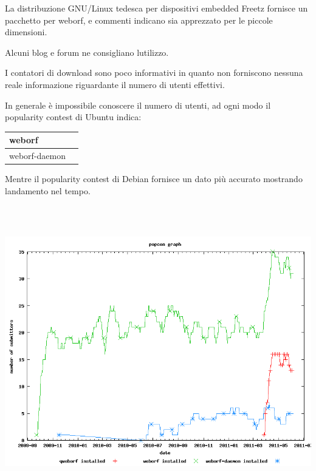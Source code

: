 \documentclass[a4paper,11pt]{article}
\makeatletter
\newcommand\captionof[1]{\def\@captype{#1}\caption}
\makeatother
\begin{document}
{\sffamily
La distribuzione GNU/Linux tedesca per dispositivi embedded Freetz
fornisce un pacchetto per weborf, e commenti indicano sia apprezzato
per le piccole dimensioni\cite{LNK02}.}

{\sffamily
Alcuni blog e forum ne consigliano
l{\textquotesingle}utilizzo\cite{LNK03}\cite{LNK04}.}

{\sffamily
I contatori di download sono poco informativi in quanto non forniscono
nessuna reale informazione riguardante il numero di utenti effettivi.}

{\sffamily
In generale \`e impossibile conoscere il numero di utenti, ad ogni modo
il popularity contest di Ubuntu indica:}

\begin{center}
\tablehead{}
\begin{supertabular}{|m{8.3cm}|m{8.3cm}|}
\hline
\sffamily weborf &
\\\hline
\sffamily weborf-daemon &
\\\hline
\end{supertabular}
\end{center}
{\sffamily
Mentre il popularity contest di Debian fornisce un dato pi\`u accurato
mostrando l{\textquotesingle}andamento nel tempo.}

\includegraphics[width=17cm,height=12.749cm]{tesi-img9.png}
\captionof{figure}[Installazioni di weborf sui sistemi debian che
partecipano al popularity contest.]{Installazioni di weborf sui sistemi
debian che partecipano al popularity contest.}
\end{document}
